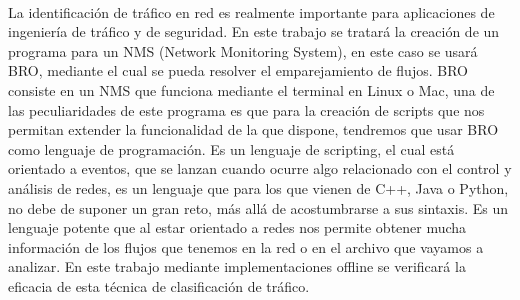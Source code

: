 \chapter*{}






\cleardoublepage
\thispagestyle{empty}

\begin{center}
{\large\bfseries \myTitle}\\
\end{center}
\begin{center}
\myName\\
\end{center}

\\

\vspace{0.7cm}
\\

La identificación de tráfico en red es realmente importante 
para aplicaciones de ingeniería de tráfico y de seguridad. 
\intro
En este trabajo se tratará la creación de un programa para 
un NMS (Network Monitoring System), en este caso se usará 
BRO, mediante el cual se pueda resolver el emparejamiento 
de flujos. BRO consiste en un NMS que funciona mediante el 
terminal en Linux o Mac, una de las peculiaridades de este 
programa es que para la creación de scripts que nos permitan 
extender la funcionalidad de la que dispone, tendremos que usar 
BRO como lenguaje de programación. Es un lenguaje de scripting, 
el cual está orientado a eventos, que se lanzan cuando ocurre 
algo relacionado con el control y análisis de redes, es un 
lenguaje que para los que vienen de C++, Java o Python, no debe 
de suponer un gran reto, más allá de acostumbrarse a sus 
sintaxis. Es un lenguaje potente que al estar orientado a redes 
nos permite obtener mucha información de los flujos que tenemos 
en la red o en el archivo que vayamos a analizar. En este trabajo 
mediante implementaciones offline se verificará la eficacia de 
esta técnica de clasificación de tráfico. 
\cleardoublepage


\thispagestyle{empty}


